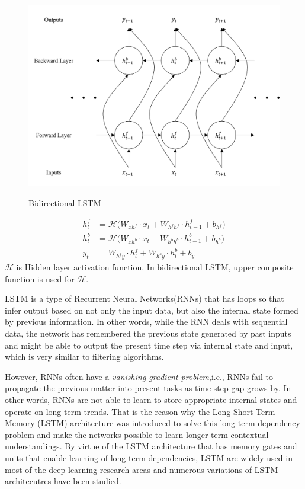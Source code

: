 \documentclass{ieeeaccess}
\begin{document}
\begin{figure}[h!]
	\centering
	\includegraphics[width=.9\linewidth]{bidirectional}
	\label{fig:bidirectional} 	
	\caption{Bidirectional LSTM}
\end{figure}
\begin{align}
h^{f}_{t} & =\mathcal{H}\big(W_{xh^{f}}\cdot x_{t}+W_{h^{f}h^{f}}\cdot h^{f}_{t-1}+b_{h^{f}}\big)\\
h^{b}_{t} & =\mathcal{H}\big(W_{xh^{b}}\cdot x_{t}+W_{h^{b}h^{b}}\cdot h^{b}_{t-1}+b_{h^{b}}\big)\\
y_{t} & =W_{h^{f}y}\cdot h^{f}_{t}+W_{h^{b}y}\cdot h^{b}_{t}+b_{y}
\end{align}
$\mathcal{H}$ is Hidden layer activation function. In bidirectional LSTM, upper composite function is used for $\mathcal{H}$.


LSTM is a type of Recurrent Neural Networks(RNNs) that has loops so that infer output based on not only the input data, but also the internal state formed by previous information. In other words, while the RNN deals with sequential data, the network has remembered the previous state generated by past inputs and might be able to output the present time step via internal state and input, which is very similar to filtering algorithms.

However, RNNs often have a \textit{vanishing gradient problem},i.e., RNNs fail to propagate the previous matter into present tasks as time step gap grows by. In other words, RNNs are not able to learn to store appropriate internal states and operate on long-term trends. That is the reason why the Long Short-Term Memory (LSTM) architecture was introduced to solve this long-term dependency problem and make the networks possible to learn longer-term contextual understandings\cite{hochreiter1997long}.
By virtue of the LSTM architecture that has memory gates and units that enable learning of long-term dependencies\cite{zaremba2014learning}, LSTM are widely used in most of the deep learning research areas and numerous variations of LSTM architecutres have been studied.
\end{document}
